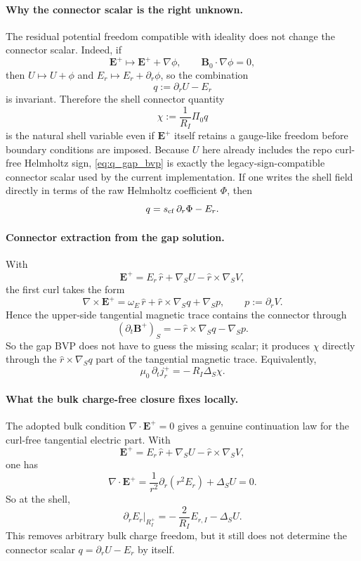 \documentclass[11pt,a4paper]{article}
\begin{document}
\paragraph{Why the connector scalar is the right unknown.}
The residual potential freedom compatible with ideality does not change the
connector scalar. Indeed, if
\[
\mathbf E^+ \mapsto \mathbf E^+ + \nabla\phi,
\qquad
\mathbf B_0\cdot\nabla\phi = 0,
\]
then \(U\mapsto U+\phi\) and \(E_r\mapsto E_r+\partial_r\phi\), so the
combination
\begin{equation}
q := \partial_r U - E_r
\label{eq:q_gap_bvp}
\end{equation}
is invariant. Therefore the shell connector quantity
\[
\chi := \frac{1}{R_I}\Pi_0 q
\]
is the natural shell variable even if \(\mathbf E^+\) itself retains a
gauge-like freedom before boundary conditions are imposed.
Because \(U\) here already includes the repo curl-free Helmholtz sign,
\eqref{eq:q_gap_bvp} is exactly the legacy-sign-compatible connector scalar
used by the current implementation. If one writes the shell field directly in
terms of the raw Helmholtz coefficient \(\Phi\), then
\[
q = s_{\rm cf}\,\partial_r \Phi - E_r.
\]

\paragraph{Connector extraction from the gap solution.}
With
\[
\mathbf E^+
=
E_r\,\hat r + \nabla_S U - \hat r\times \nabla_S V,
\]
the first curl takes the form
\[
\nabla\times \mathbf E^+
=
\omega_E\,\hat r
+
\hat r\times \nabla_S q
+
\nabla_S p,
\qquad
p:=\partial_r V.
\]
Hence the upper-side tangential magnetic trace contains the connector through
\[
(\partial_t\mathbf B^+)_S
=
-\,\hat r\times \nabla_S q
- \nabla_S p.
\]
So the gap BVP does not have to guess the missing scalar; it produces
\(\chi\) directly through the \(\hat r\times \nabla_S q\) part of the
tangential magnetic trace. Equivalently,
\[
\mu_0\,\partial_t j_r^+
=
-\,R_I\Delta_S \chi.
\]

\paragraph{What the bulk charge-free closure fixes locally.}
The adopted bulk condition \(\nabla\cdot \mathbf E^+=0\) gives a genuine
continuation law for the curl-free tangential electric part. With
\[
\mathbf E^+
=
E_r\,\hat r + \nabla_S U - \hat r\times \nabla_S V,
\]
one has
\begin{equation}
\nabla\cdot \mathbf E^+
=
\frac{1}{r^2}\partial_r(r^2 E_r) + \Delta_S U
= 0.
\label{eq:gap_divfree_E}
\end{equation}
So at the shell,
\begin{equation}
\partial_r E_r\big|_{R_I^+}
=
-\,\frac{2}{R_I}E_{r,I} - \Delta_S U.
\label{eq:gap_divfree_E_shell}
\end{equation}
This removes arbitrary bulk charge freedom, but it still does not determine
the connector scalar \(q=\partial_r U-E_r\) by itself.
\end{document}
